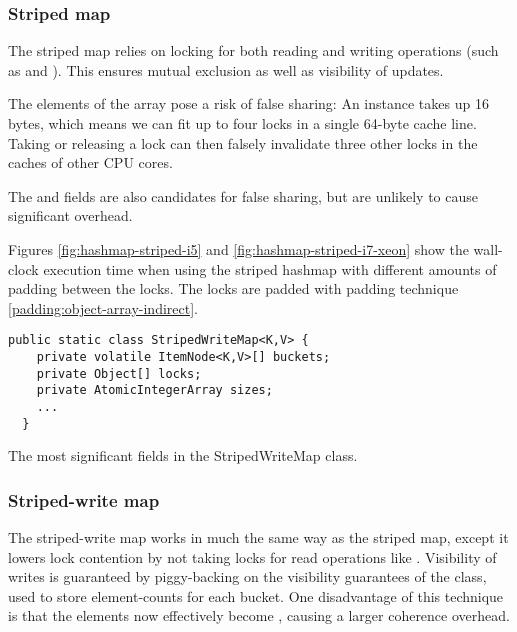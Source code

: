 \subsubsection{Striped map}
The striped map relies on locking for both reading and writing operations (such
as  and ). This ensures mutual exclusion as well as
visibility of updates.

The elements of the  array pose a risk of false sharing: An
 instance takes up 16 bytes\footnotemark, which means we can fit
up to four locks in a single 64-byte cache line. Taking or releasing a lock can
then falsely invalidate three other locks in the caches of other CPU cores.

The  and  fields are also candidates for false
sharing, but are unlikely to cause significant overhead.


Figures \ref{fig:hashmap-striped-i5} and \ref{fig:hashmap-striped-i7-xeon} show
the wall-clock execution time when using the striped hashmap with different
amounts of padding between the locks. The locks are padded with padding
technique \ref{padding:object-array-indirect}.

\begin{code}
\begin{Verbatim}[frame=single]
  public static class StripedWriteMap<K,V> {
    private volatile ItemNode<K,V>[] buckets;
    private Object[] locks;
    private AtomicIntegerArray sizes;
    ...
  }
\end{Verbatim}
	\caption{The most significant fields in the StripedWriteMap class.}
\end{code}

\subsubsection{Striped-write map}
The striped-write map works in much the same way as the striped map, except it
lowers lock contention by not taking locks for read operations like .
Visibility of writes is guaranteed by piggy-backing on the visibility
guarantees of the  class, used to store element-counts
for each bucket. One disadvantage of this technique is that the 
elements now effectively become , causing a larger coherence
overhead.


